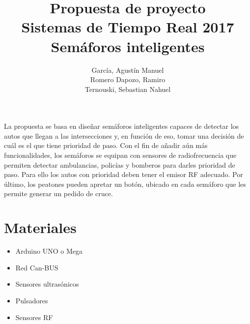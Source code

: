 \documentclass[a4paper,11pt]{article}
\title{Propuesta de proyecto
		\\Sistemas de Tiempo Real 2017
		\\{\Large Semáforos inteligentes}
}
\author{García, Agustín Manuel
\\Romero Dapozo, Ramiro
\\Ternouski, Sebastian Nahuel}
\date{}
\begin{document}
\maketitle

La propuesta se basa en diseñar semáforos inteligentes capaces de detectar los autos que llegan a las intersecciones y, en función de eso, tomar una decisión de cuál es el que tiene prioridad de paso.
Con el fin de añadir aún más funcionalidades, los semáforos se equipan con sensores de radiofrecuencia que permiten detectar ambulancias,  policías y bomberos para darles prioridad de paso.
Para ello los autos con prioridad deben tener el emisor RF adecuado. 
Por último, los peatones pueden apretar un botón, ubicado en cada semáforo que les permite generar un pedido de cruce.

\section*{Materiales}
\begin{itemize}
	\item Arduino UNO o Mega
	\item Red Can-BUS
	\item Sensores ultrasónicos
	\item Pulsadores
	\item Sensores RF
\end{itemize}
\end{document}
